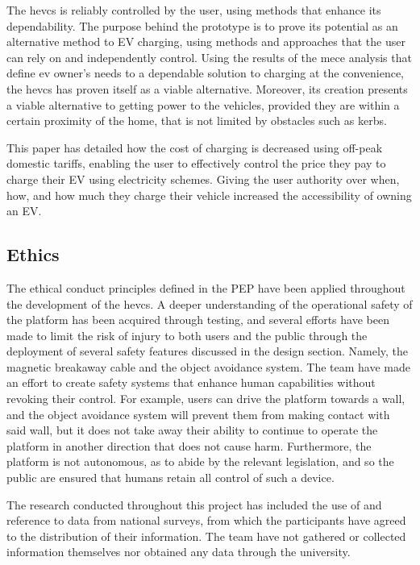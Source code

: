 \documentclass [12pt]{article}
\begin{document}
The \gls{hevcs} is reliably controlled by the user, using methods that enhance its dependability. The purpose behind the prototype is to prove its potential as an alternative method to EV charging, using methods and approaches that the user can rely on and independently control. Using the results of the \gls{mece} analysis that define \gls{ev} owner’s needs to a dependable solution to charging at the convenience, the \gls{hevcs} has proven itself as a viable alternative. Moreover, its creation presents a viable alternative to getting power to the vehicles, provided they are within a certain proximity of the home, that is not limited by obstacles such as kerbs.

This paper has detailed how the cost of charging is decreased using off-peak domestic tariffs, enabling the user to effectively control the price they pay to charge their EV using electricity schemes. Giving the user authority over when, how, and how much they charge their vehicle increased the accessibility of owning an EV.

\subsection{Ethics}

The ethical conduct principles defined in the PEP have been applied throughout the development of the \gls{hevcs}. A deeper understanding of the operational safety of the platform has been acquired through testing, and several efforts have been made to limit the risk of injury to both users and the public through the deployment of several safety features discussed in the design section. Namely, the magnetic breakaway cable and the object avoidance system. The team have made an effort to create safety systems that enhance human capabilities without revoking their control. For example, users can drive the platform towards a wall, and the object avoidance system will prevent them from making contact with said wall, but it does not take away their ability to continue to operate the platform in another direction that does not cause harm. Furthermore, the platform is not autonomous, as to abide by the relevant legislation, and so the public are ensured that humans retain all control of such a device.

The research conducted throughout this project has included the use of and reference to data from national surveys, from which the participants have agreed to the distribution of their information. The team have not gathered or collected information themselves nor obtained any data through the university.
\end{document}
